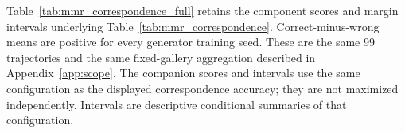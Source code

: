 Table~\ref{tab:mmr_correspondence_full} retains the component scores and margin
intervals underlying Table~\ref{tab:mmr_correspondence}. Correct-minus-wrong
means are positive for every generator training seed.
These are the same 99 trajectories and the same fixed-gallery aggregation
described in Appendix~\ref{app:scope}. The companion scores and intervals use
the same configuration as the displayed correspondence accuracy; they are
not maximized independently. Intervals are descriptive conditional summaries
of that configuration.




